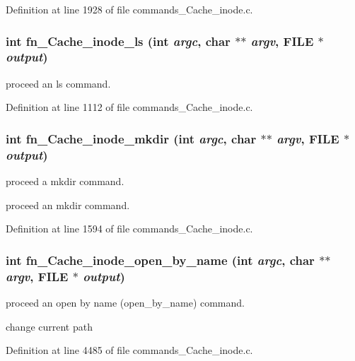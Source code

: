 Definition at line 1928 of file commands\_\-Cache\_\-inode.c.
\subsubsection[{fn\_\-Cache\_\-inode\_\-ls}]{\setlength{\rightskip}{0pt plus 5cm}int fn\_\-Cache\_\-inode\_\-ls (int {\em argc}, \/  char $\ast$$\ast$ {\em argv}, \/  FILE $\ast$ {\em output})}\label{commands_8h_a2ba98a95ea4426bf580d55f4dacab3b7}
proceed an ls command. 

Definition at line 1112 of file commands\_\-Cache\_\-inode.c.
\subsubsection[{fn\_\-Cache\_\-inode\_\-mkdir}]{\setlength{\rightskip}{0pt plus 5cm}int fn\_\-Cache\_\-inode\_\-mkdir (int {\em argc}, \/  char $\ast$$\ast$ {\em argv}, \/  FILE $\ast$ {\em output})}\label{commands_8h_a9230f34cda91d77f51bb32b5acf2b4ae}
proceed a mkdir command.

proceed an mkdir command. 

Definition at line 1594 of file commands\_\-Cache\_\-inode.c.
\subsubsection[{fn\_\-Cache\_\-inode\_\-open\_\-by\_\-name}]{\setlength{\rightskip}{0pt plus 5cm}int fn\_\-Cache\_\-inode\_\-open\_\-by\_\-name (int {\em argc}, \/  char $\ast$$\ast$ {\em argv}, \/  FILE $\ast$ {\em output})}\label{commands_8h_a645198e6ac2e4e29a4df46b005b1c6eb}
proceed an open by name (open\_\-by\_\-name) command.

change current path 

Definition at line 4485 of file commands\_\-Cache\_\-inode.c.

